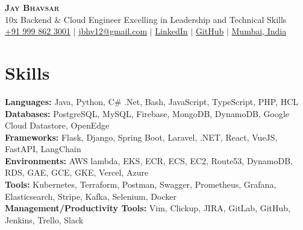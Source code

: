\documentclass[letterpaper,11pt]{article}
\newcommand{\resumeSubHeadingListStart}{\begin{itemize}[leftmargin=0.15in, label={}]}
\newcommand{\resumeSubHeadingListEnd}{\end{itemize}}
\begin{document}

\begin{center}
  \textbf{\Huge \scshape Jay Bhavsar} \\ \vspace{3pt}
  \normalsize 10x Backend \& Cloud Engineer Excelling in Leadership and Technical Skills \\ \vspace{3pt}
  \small
  \faMobile \hspace{.5pt} \href{tel:919998623001}{+91 999 862 3001}
  $|$
  \faAt \hspace{.5pt} \href{mailto:jbhv12@gmail.com}{jbhv12@gmail.com}
  $|$
  \faLinkedinSquare \hspace{.5pt} \href{https://www.linkedin.com/in/jbhv12/}{LinkedIn}
  $|$
  \faGithub \hspace{.5pt} \href{https://github.com/jbhv12}{GitHub}
  $|$
  \faMapMarker \hspace{.5pt} \href{https://goo.gl/maps/Czh1vXePukiKumpu5}{Mumbai, India}
\end{center}




\section{Skills}
\vspace{2pt}
\resumeSubHeadingListStart
\small{\item{
              \textbf{Languages:}{ Java, Python, C\# .Net, Bash, JavaScript, TypeScript, PHP, HCL} \\ \vspace{3pt}
              \textbf{Databases:}{ PostgreSQL, MySQL, Firebase, MongoDB, DynamoDB, Google Cloud Datastore, OpenEdge} \\ \vspace{3pt}
              \textbf{Frameworks:}{ Flask, Django, Spring Boot, Laravel, .NET, React, VueJS, FastAPI, LangChain} \\ \vspace{3pt}
              \textbf{Environments:}{ AWS lambda, EKS, ECR, ECS, EC2, Route53, DynamoDB, RDS, GAE, GCE, GKE, Vercel, Azure} \\ \vspace{3pt}
              \textbf{Tools:}{ Kubernetes, Terraform, Postman, Swagger, Prometheus, Grafana, Elasticsearch, Stripe, Kafka, Selenium, Docker} \\ \vspace{3pt}
              \textbf{Management/Productivity Tools:}{ Vim, Clickup, JIRA, GitLab, GitHub, Jenkins, Trello, Slack} \\ \vspace{3pt}
        }}
\resumeSubHeadingListEnd
\end{document}
